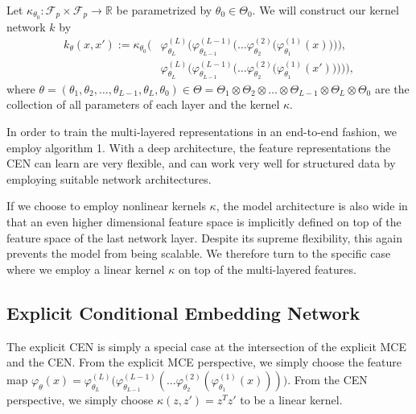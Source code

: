 \documentclass[runningheads, envcountsame, a4paper]{llncs}
\begin{document}
			Let $\kappa_{\theta_{0}} : \mathcal{F}_{p} \times \mathcal{F}_{p} \to \mathbb{R}$ be parametrized by $\theta_{0} \in \Theta_{0}$. We will construct our kernel network $k$ by
			\begin{equation}
			\begin{aligned}
				k_{\theta}(x, x') := \kappa_{\theta_{0}}\Bigg(& \varphi^{(L)}_{\theta_{L}}\bigg(\varphi^{(L - 1)}_{\theta_{L - 1}}\Big(\dots\varphi^{(2)}_{\theta_{2}}\big(\varphi^{(1)}_{\theta_{1}}(x)\big)\Big)\bigg), \\
				&\varphi^{(L)}_{\theta_{L}}\bigg(\varphi^{(L - 1)}_{\theta_{L - 1}}\Big(\dots\varphi^{(2)}_{\theta_{2}}\big(\varphi^{(1)}_{\theta_{1}}(x')\big)\Big)\bigg) \Bigg),
			\label{eq:deep_conditional_embedding_network}
			\end{aligned}
			\end{equation}
			where $\theta = (\theta_{1}, \theta_{2}, \dots, \theta_{L -1}, \theta_{L}, \theta_{0}) \in \Theta = \Theta_{1} \otimes \Theta_{2} \otimes \dots \otimes \Theta_{L - 1} \otimes \Theta_{L} \otimes \Theta_{0}$ are the collection of all parameters of each layer and the kernel $\kappa$.
			
			In order to train the multi-layered representations in an end-to-end fashion, we employ algorithm 1. With a deep architecture, the feature representations the \gls{CEN} can learn are very flexible, and can work very well for structured data by employing suitable network architectures.
			
			If we choose to employ nonlinear kernels $\kappa$, the model architecture is also wide in that an even higher dimensional feature space is implicitly defined on top of the feature space of the last network layer. Despite its supreme flexibility, this again prevents the model from being scalable. We therefore turn to the specific case where we employ a linear kernel $\kappa$ on top of the multi-layered features.
			
		\subsection{Explicit Conditional Embedding Network}
		\label{app:explicit_conditional_embedding_network}
			
			The explicit \gls{CEN} is simply a special case at the intersection of the explicit \gls{MCE} and the \gls{CEN}. From the explicit \gls{MCE} perspective, we simply choose the feature map $\varphi_{\theta}(x) = \varphi^{(L)}_{\theta_{L}}\big(\varphi^{(L - 1)}_{\theta_{L - 1}}(\dots\varphi^{(2)}_{\theta_{2}}(\varphi^{(1)}_{\theta_{1}}(x)))\big)$. From the \gls{CEN} perspective, we simply choose $\kappa(z, z') = z^{T} z'$ to be a linear kernel.
			
\end{document}
